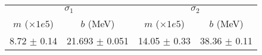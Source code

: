 \begin{tabular}{cc|cc}
\multicolumn{2}{c|}{$\sigma_1$} & \multicolumn{2}{|c}{$\sigma_2$} \\
$m$ ($\times1e5$) & $b$ (MeV) & $m$ ($\times1e5$) & $b$ (MeV) \\
\hline
8.72 $\pm$ 0.14 & 21.693 $\pm$ 0.051 & 14.05 $\pm$ 0.33 & 38.36 $\pm$ 0.11\\
\end{tabular}
